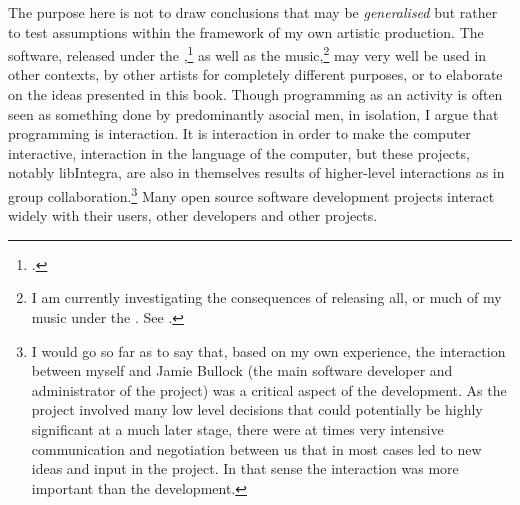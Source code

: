 The purpose here is not to draw conclusions that may be \emph{generalised} but rather to test assumptions within the framework of my own artistic production. The software, released under the ,\footcite{GNUGPL} as well as the music,\footnote{I am currently investigating the consequences of releasing all, or much of my music under the . See \cite{CCLIC}.} may very well be used in other contexts, by other artists for completely different purposes, or to elaborate on the ideas presented in this book. Though programming as an activity is often seen as something done by predominantly asocial men, in isolation, I argue that programming is interaction. It is interaction in order to make the computer interactive, interaction in the language of the computer, but these projects, notably libIntegra, are also in themselves results of higher-level interactions as in group collaboration.\footnote{I would go so far as to say that, based on my own experience, the interaction between myself and Jamie Bullock (the main software developer and administrator of the project) was a critical aspect of the development. As the project involved many low level decisions that could potentially be highly significant at a much later stage, there were at times very intensive communication and negotiation between us that in most cases led to new ideas and input in the project. In that sense the interaction was more important than the development.} Many open source software development projects interact widely with their users, other developers and other projects.

